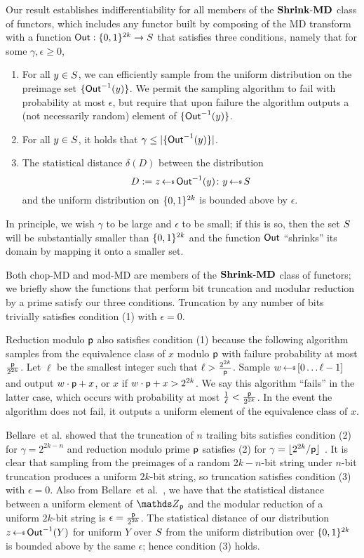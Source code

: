 Our result establishes indifferentiability for all members of the $\ShrinkMD$ class of functors, which
includes any functor built by composing of the MD transform with a function $\Out: \bits^{2k} \to \S$ that satisfies three conditions, namely that for some $\gamma, \epsilon \geq 0$,
\begin{enumerate}
	\item For all $y \in \S$, we can efficiently sample from the uniform distribution on the preimage set $\{\Out^{-1}(y)\}$. We permit the sampling algorithm to fail with probability at most $\epsilon$, but require that upon failure the algorithm outputs a (not necessarily random) element of $\{\Out^{-1}(y)\}$.
	\item For all $y \in \S$, it holds that $\gamma \leq |\{\Out^{-1}(y)\}|$.
	\item The statistical distance $\delta(D)$ between the distribution
	\[D:= z \getsr \Out^{-1}(y) \colon y \getsr \S\] 
	and the uniform distribution on $\bits^{2k}$ is bounded above by $\epsilon$.
\end{enumerate}
In principle, we wish $\gamma$ to be large and $\epsilon$ to be small; if this is so,
then the set $\S$ will be substantially smaller than $\bits^{2k}$ and the function $\Out$
``shrinks'' its domain by mapping it onto a smaller set.

Both chop-MD and mod-MD are members of the $\ShrinkMD$ class of functors;
we briefly show the functions that perform bit truncation and modular reduction by a prime satisfy
our three conditions.
Truncation by any number of bits trivially satisfies condition (1) with $\epsilon = 0$.

Reduction modulo $\Prime$ also satisfies condition (1) because the following algorithm samples from the equivalence class of $x$ modulo $\Prime$ with failure probability at most $\frac{\Prime}{2^{2k}}$.
Let $\ell$ be the smallest integer
such that $\ell > \frac{2^{2k}}{\Prime}$. Sample $w \getsr [0 \ldots \ell-1]$ and output $w \cdot \Prime + x$, or $x$ if $w  \cdot \Prime + x> 2^{2k}$.
We say this algorithm ``fails'' in the latter case, which occurs with probability at most $\frac{1}{\ell} < \frac{\Prime}{2^{2k}}$.
In the event the algorithm does not fail, it outputs a uniform element of the equivalence class of $x$.

Bellare~et al. showed that the truncation of $n$ trailing bits satisfies condition (2) for $\gamma = 2^{2k-n}$ and reduction modulo prime $\Prime$ satisfies (2) for 
$\gamma = \lfloor {2^{2k}}/\Prime \rfloor$ .
It is clear that sampling from the preimages of a random $2k-n$-bit string under $n$-bit truncation produces a uniform $2k$-bit string, so truncation satisfies condition (3) with $\epsilon = 0$.
Also from Bellare~et al.~\cite{EC:BelBerTes16}, we have that the statistical distance between a uniform element of $\Z_{\Prime}$ and the modular reduction of a uniform $2k$-bit string is $\epsilon = \frac{\Prime}{2^{2k}}$.
The statistical distance of our distribution $z \getsr \Out^{-1}(Y)$ for uniform $Y$ over $\S$ from the uniform distribution over $\bits^{2k}$ is bounded above by the same $\epsilon$; hence condition (3) holds.

